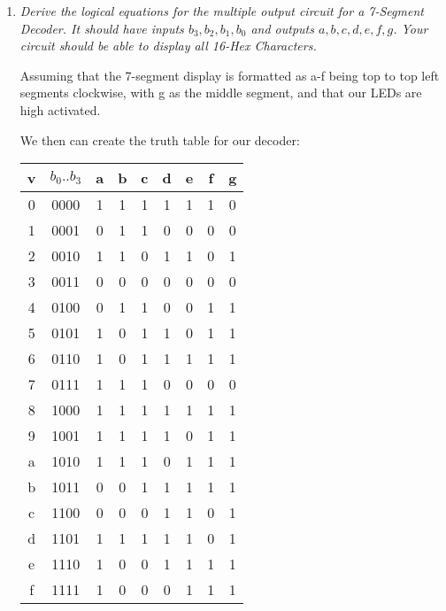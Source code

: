 \documentclass[12pt]{article}
\begin{document}
\begin{enumerate}
\begin{enumerate}
	      \end{enumerate}

	      \newpage
	\item \textit{Derive the logical equations for the multiple output circuit for a 7-Segment Decoder. It should have inputs $b_3, b_2, b_1, b_0$ and outputs $a, b, c, d, e, f, g$. Your circuit should be able to display all 16-Hex Characters.}

	      Assuming that the 7-segment display is formatted as a-f being top to top left segments clockwise, with g as the middle segment, and that our LEDs are high activated.

	      We then can create the truth table for our decoder:
        \begin{center}

        \begin{tabular}{c|c|ccccccc}
          \hline
          v & $b_0..b_3$ & a & b & c & d & e & f & g \\
          \hline
          0 & 0000 & 1 & 1 & 1 & 1 & 1 & 1 & 0 \\
          1 & 0001 & 0 & 1 & 1 & 0 & 0 & 0 & 0 \\
          2 & 0010 & 1 & 1 & 0 & 1 & 1 & 0 & 1 \\
          3 & 0011 & 0 & 0 & 0 & 0 & 0 & 0 & 0 \\
          4 & 0100 & 0 & 1 & 1 & 0 & 0 & 1 & 1 \\
          5 & 0101 & 1 & 0 & 1 & 1 & 0 & 1 & 1 \\
          6 & 0110 & 1 & 0 & 1 & 1 & 1 & 1 & 1 \\
          7 & 0111 & 1 & 1 & 1 & 0 & 0 & 0 & 0 \\
          8 & 1000 & 1 & 1 & 1 & 1 & 1 & 1 & 1 \\
          9 & 1001 & 1 & 1 & 1 & 1 & 0 & 1 & 1 \\
          a & 1010 & 1 & 1 & 1 & 0 & 1 & 1 & 1 \\
          b & 1011 & 0 & 0 & 1 & 1 & 1 & 1 & 1 \\
          c & 1100 & 0 & 0 & 0 & 1 & 1 & 0 & 1 \\
          d & 1101 & 1 & 1 & 1 & 1 & 1 & 0 & 1 \\
          e & 1110 & 1 & 0 & 0 & 1 & 1 & 1 & 1 \\
          f & 1111 & 1 & 0 & 0 & 0 & 1 & 1 & 1 \\
        \end{tabular}


\end{center}
\end{enumerate}
\end{document}
